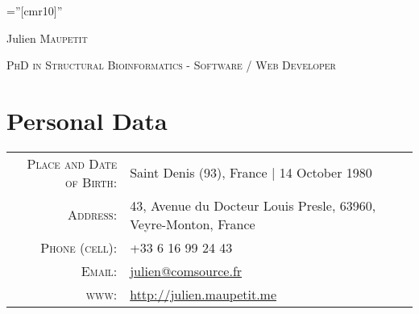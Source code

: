 \documentclass[a4paper,10pt]{article}
\begin{document}

\thispagestyle{empty} %

\font\fb=''[cmr10]'' %

\par{\centering
		{\Huge Julien \textsc{Maupetit}
	}\bigskip\par}
\par{\centering
		{\textsc{PhD in Structural Bioinformatics - Software / Web Developer}
	}\bigskip\par}

\section{Personal Data}

\begin{tabular}{rl}
    \textsc{Place and Date of Birth:} & Saint Denis (93), France  | 14 October 1980 \\
    \textsc{Address:}   & 43, Avenue du Docteur Louis Presle, 63960, Veyre-Monton, France \\
    \textsc{Phone (cell):}     & +33 6 16 99 24 43\\
    \textsc{Email:}     & \href{mailto:julien@comsource.fr}{julien@comsource.fr}\\
    \textsc{www:}       & \href{http://julien.maupetit.me}{http://julien.maupetit.me}\\
\end{tabular}


\end{document}
